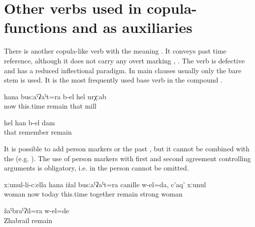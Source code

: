 \section{Other verbs used in copula-functions and as auxiliaries}
\label{sec:Other verbs used in copula-functions and as auxiliaries}

There is another copula-like verb  with the meaning . It conveys past time reference, although it does not carry any overt marking , . The verb is defective and has a reduced inflectional paradigm. In main clauses usually only the bare stem is used. It is the most frequently used base verb in the compound  .
%
\begin{exe}
	\ex	\label{ex:Even nowadays that mill remained (i.e. is still there)}
	\gll	hana	busːaˁʡaˁt=ra	b-el	hel	urχːab\\
		now	this.time	remain	that	mill\\
	\glt	{}

	\ex	\label{ex:I remember this (i.e. it remained in my memory)}
	\gll	hel	han	b-el	dam\\
		that	remember	remain	\\
	\glt	{}
\end{exe}

It is possible to add person markers  or the past  , but it cannot be combined with the  (e.g. ). The use of person markers with first and second agreement controlling arguments is obligatory, i.e. in  the person   cannot be omitted.
%
\begin{exe}
	\ex	\label{ex:I stayed together with my wife even until today; a good (strong) woman}
	\gll	xːunul-li-cːella hana	ižal	busːaˁʡaˁt=ra	canille	w-el=da,	c'aq'	xːunul\\
		woman	now	today	this.time	together	remain		strong	woman\\
	\glt	{}

	\ex	\label{ex:Zhabrail remained}
	\gll	žaˁbraˁʔil=ra	w-el=de\\
		Zhabrail	remain\\
	\glt	{}
\end{exe}

